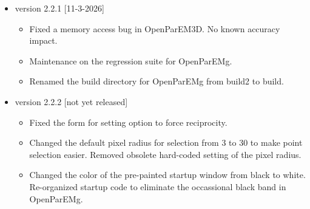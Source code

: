 \documentclass[titlepage]{article}
\renewcommand\_{\textunderscore\linebreak[1]}
\begin{document}
\begin{itemize}[nosep]
   \item version 2.2.1 [11-3-2026]
      \begin{itemize}[nosep]
         \item Fixed a memory access bug in OpenParEM3D.  No known accuracy impact.
         \item Maintenance on the regression suite for OpenParEMg.
         \item Renamed the build directory for OpenParEMg from build2 to build.
      \end{itemize}

   \item version 2.2.2 [not yet released]
      \begin{itemize}[nosep]
         \item Fixed the form for setting option to force reciprocity.
         \item Changed the default pixel radius for selection from 3 to 30 to make point selection easier. Removed obsolete hard-coded setting of the pixel radius.
         \item Changed the color of the pre-painted startup window from black to white.  Re-organized startup code to eliminate the occassional black band in OpenParEMg.
      \end{itemize}


\end{itemize}
\end{document}
